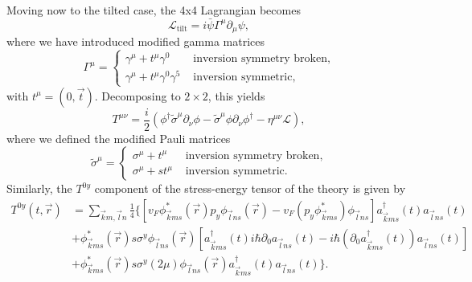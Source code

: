 Moving now to the tilted case, the 4x4 Lagrangian becomes \cite{vanderwurffMagnetovorticalThermoelectricTransport2019}
\begin{equation}
  \label{eq:60}
  \mathcal{L}_{\text{tilt}} = i \bar{\psi} \Gamma ^{\mu }\partial_{\mu } \psi ,
\end{equation}
where we have introduced modified gamma matrices
\begin{equation}
  \label{eq:61}
  \Gamma ^{\mu } =
  \begin{cases}
    \gamma ^{\mu } + t^{\mu} \gamma ^0& \text{ inversion symmetry broken},\\
    \gamma^{\mu} + t^{\mu} \gamma^0 \gamma^5 & \text{ inversion symmetric},
  \end{cases}
\end{equation}
with \( t^{\mu } = (0, \vec{t}) \).
Decomposing to \( 2\times 2 \), this yields
\begin{equation}
  \label{eq:62}
  T^{\mu \nu} =
  \frac{i}{2} (
  \phi^{\dagger} \tilde{\sigma} ^{\mu} \partial_{\nu} \phi
  - \tilde{\sigma} ^{\mu} \phi \partial_{\nu} \phi^{\dagger}
  - \eta^{\mu \nu} \mathcal{L}
  ),
\end{equation}
where we defined the modified Pauli matrices
\begin{equation}
  \label{eq:63}
  \tilde{\sigma}^{\mu} =
  \begin{cases}
    \sigma^{\mu} + t^{\mu} & \text{ inversion symmetry broken},\\
    \sigma^{\mu} + s t^{\mu} & \text{ inversion symmetric}.
  \end{cases}
\end{equation}
Similarly, the $T^{0y}$ component of the stress-energy tensor of the theory is given by~\cite{arjonaFingerprintsConformalAnomaly2019}
\begin{equation}
  \begin{split}
    T^{0y}(t, \vec{r}) &=
    \sum\limits_{\vec{k} m, \vec{l} n}^{}
    \frac{1}{4}
    \bigg\{
    \left[
      v_F \phi ^{*}_{\vec{k} m s}(\vec{r}) p_y \phi _{\vec{l} n s}(\vec{r})
      -v_F \left( p_y \phi ^{*}_{\vec{k} m s} \right) \phi _{\vec{l} ns}
    \right] a^{\dagger}_{\vec{k} m s}(t) a_{\vec{l} n s}(t)\\
    &+ \phi ^{*}_{\vec{k} m s}(\vec{r}) s \sigma ^y \phi _{\vec{l} n s }(\vec{r})
    \left[
      a^{\dagger}_{\vec{k} m s}(t) i\hbar \partial _0  a_{\vec{l} n s}(t)
      -
      i\hbar \left(\partial _0 a^{\dagger}_{\vec{k} ms }(t) \right) a_{\vec{l} n s}(t)
    \right]\\
    &+ \phi ^{*}_{\vec{k} m s}(\vec{r}) s \sigma ^y (2\mu ) \phi _{\vec{l} n s}(\vec{r}) a^{\dagger}_{\vec{k} m s}(t) a_{\vec{l} n s}(t)
    \bigg\}.
  \end{split}
\end{equation}
